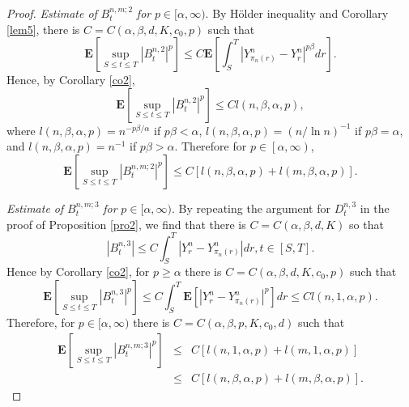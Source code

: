 \documentclass[11pt]{amsart}
\theoremstyle{plain}
\numberwithin{equation}{section}
\begin{document}
\begin{proof}
\emph{Estimate of }$B_{t}^{n,m;2}$ \emph{for }$p\in \lbrack \alpha ,\infty )$. By H\"{o}lder inequality and Corollary \ref{lem5}, there is $C=C\left(
\alpha ,\beta ,d,K,c_{0},p\right) $ such that\begin{equation*}
\mathbf{E}\left[ \sup_{S\leq t\leq T}\left\vert B_{t}^{n,2}\right\vert ^{p}\right] \leq C\mathbf{E}\left[ \int_{S}^{T}\left\vert Y_{\pi _{n}\left(
r\right) }^{n}-Y_{r}^{n}\right\vert ^{p\beta }dr\right] .
\end{equation*}Hence, by Corollary \ref{co2},\begin{equation*}
\mathbf{E}\left[ \sup_{S\leq t\leq T}\left\vert B_{t}^{n,2}\right\vert ^{p}\right] \leq Cl(n,\beta ,\alpha ,p),
\end{equation*}where $l(n,\beta ,\alpha ,p)=n^{-p\beta /\alpha }$ if $p\beta <\alpha $, $l(n,\beta ,\alpha ,p)=\left( n/\ln n\right) ^{-1}$ if $p\beta =\alpha $, and 
$l(n,\beta ,\alpha ,p)=n^{-1}$ if $p\beta >\alpha .$ Therefore for $p\in \left[ \alpha ,\infty \right) $, 
\begin{equation*}
\mathbf{E}\left[ \sup_{S\leq t\leq T}\left\vert B_{t}^{n,m;2}\right\vert ^{p}\right] \leq C[l(n,\beta ,\alpha ,p)+l\left( m,\beta ,\alpha ,p\right) ].
\end{equation*}

\emph{Estimate of }$B_{t}^{n,m;3}$ \emph{for }$p\in \lbrack \alpha ,\infty )$. By repeating the argument for $D_{t}^{n,3}$ in the proof of Proposition \ref{pro2}, we find that there is $C=C\left( \alpha ,\beta ,d,K\right) $ so
that 
\begin{equation*}
\left\vert B_{t}^{n,3}\right\vert \leq C\int_{S}^{T}\left\vert
Y_{r}^{n}-Y_{\pi _{n}\left( r\right) }^{n}\right\vert dr,t\in \left[ S,T\right] .
\end{equation*}Hence by Corollary \ref{co2}, for $p\geq \alpha $ there is $C=C\left( \alpha
,\beta ,d,K,c_{0},p\right) $ such that 
\begin{equation*}
\mathbf{E}\left[ \sup_{S\leq t\leq T}\left\vert B_{t}^{n,3}\right\vert ^{p}\right] \leq C\int_{S}^{T}\mathbf{E}\left[ \left\vert Y_{r}^{n}-Y_{\pi
_{n}\left( r\right) }^{n}\right\vert ^{p}\right] dr\leq Cl\left( n,1,\alpha
,p\right) .
\end{equation*}Therefore, for $p\in \lbrack \alpha ,\infty )$ there is $C=C\left( \alpha
,\beta ,p,K,c_{0},d\right) $ such that 
\begin{eqnarray*}
\mathbf{E}\left[ \sup_{S\leq t\leq T}\left\vert B_{t}^{n,m;3}\right\vert ^{p}\right] &\leq &C\left[ l\left( n,1,\alpha ,p\right) +l\left( m,1,\alpha
,p\right) \right] \\
&\leq &C\left[ l\left( n,\beta ,\alpha ,p\right) +l\left( m,\beta ,\alpha
,p\right) \right] .
\end{eqnarray*}


\end{proof}
\end{document}
